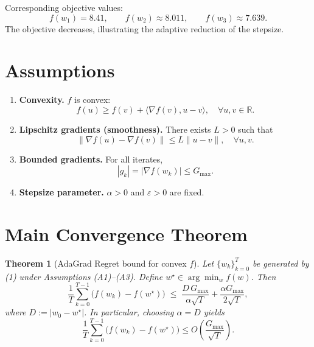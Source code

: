 \documentclass{article}
\newtheorem{theorem}{Theorem}
\begin{document}
Corresponding objective values:
\[
f(w_1)=8.41,\qquad f(w_2)\approx8.011,\qquad f(w_3)\approx7.639.
\]
The objective decreases, illustrating the adaptive reduction of the stepsize.

\section*{Assumptions}
\begin{enumerate}
\item \textbf{Convexity.} $f$ is convex:
\[
f(u)\ge f(v)+\langle \nabla f(v),u-v\rangle,\quad\forall u,v\in\mathbb{R}.
\tag{A1}
\]
\item \textbf{Lipschitz gradients (smoothness).} There exists $L>0$ such that
\[
\|\nabla f(u)-\nabla f(v)\|\le L\|u-v\|,\quad\forall u,v.
\tag{A2}
\]
\item \textbf{Bounded gradients.} For all iterates,
\[
|g_k|=|\nabla f(w_k)|\le G_{\max }.
\tag{A3}
\]
\item \textbf{Stepsize parameter.} $\alpha>0$ and $\varepsilon>0$ are fixed.
\end{enumerate}

\section*{Main Convergence Theorem}
\begin{theorem}[AdaGrad Regret bound for convex $f$]\label{thm:regret}
Let $\{w_k\}_{k=0}^{T}$ be generated by (1) under Assumptions (A1)–(A3).  
Define $w^{\star}\in\arg\min_{w}f(w)$. Then
\[
\frac{1}{T}\sum_{k=0}^{T-1}\bigl(f(w_k)-f(w^{\star})\bigr)
\;\le\;
\frac{D\,G_{\max}}{\alpha\sqrt{T}}+\frac{\alpha G_{\max}}{2\sqrt{T}} ,
\tag{2}
\]
where $D:=|w_0-w^{\star}|$.
In particular, choosing $\alpha=D$ yields
\[
\frac{1}{T}\sum_{k=0}^{T-1}\bigl(f(w_k)-f(w^{\star})\bigr)
\le O\!\left(\frac{G_{\max}}{\sqrt{T}}\right).
\]
\end{theorem}

\end{document}
